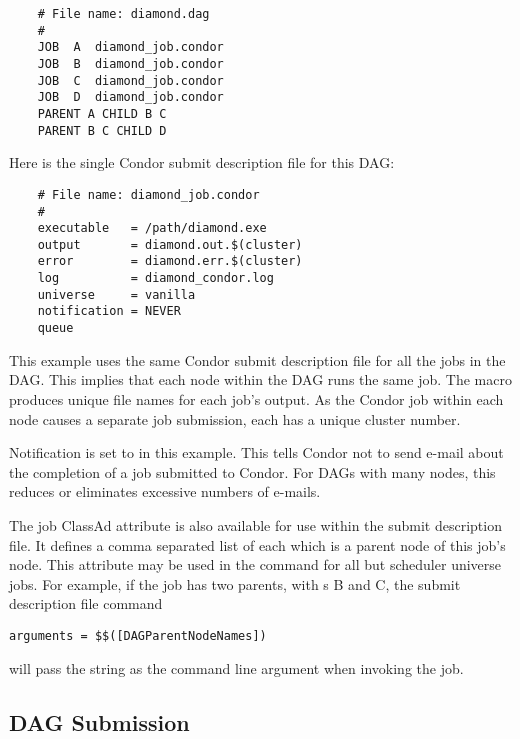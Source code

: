 \begin{verbatim}
    # File name: diamond.dag
    #
    JOB  A  diamond_job.condor 
    JOB  B  diamond_job.condor 
    JOB  C  diamond_job.condor	
    JOB  D  diamond_job.condor
    PARENT A CHILD B C
    PARENT B C CHILD D
\end{verbatim}

Here is the single Condor submit description file
for this DAG:

\begin{verbatim}
    # File name: diamond_job.condor
    #
    executable   = /path/diamond.exe
    output       = diamond.out.$(cluster)
    error        = diamond.err.$(cluster)
    log          = diamond_condor.log
    universe     = vanilla
    notification = NEVER
    queue
\end{verbatim}

This example uses the same Condor submit description file
for all the jobs in the DAG.
This implies that each node within the DAG runs the
same job.
The  macro
produces unique file names for each job's output.
As the Condor job within each node
causes a separate job submission, each has a unique cluster number.

Notification is set to \verb@NEVER@ in this example.
This tells Condor not to send e-mail about the completion of a job
submitted to Condor.
For DAGs with many nodes, this
reduces or eliminates excessive numbers of e-mails.

The job ClassAd attribute  is also available
for use within the submit description file. 
It defines a comma separated list of each 
which is a parent node of this job's node.
This attribute may be used in the  command
for all but scheduler universe jobs.
For example, if the job has two parents, with s B and C,
the submit description file command
\begin{verbatim}
arguments = $$([DAGParentNodeNames])
\end{verbatim}
will pass the string  as the command line argument when invoking
the job.

\subsection{\label{dagman:submitdag}DAG Submission}

